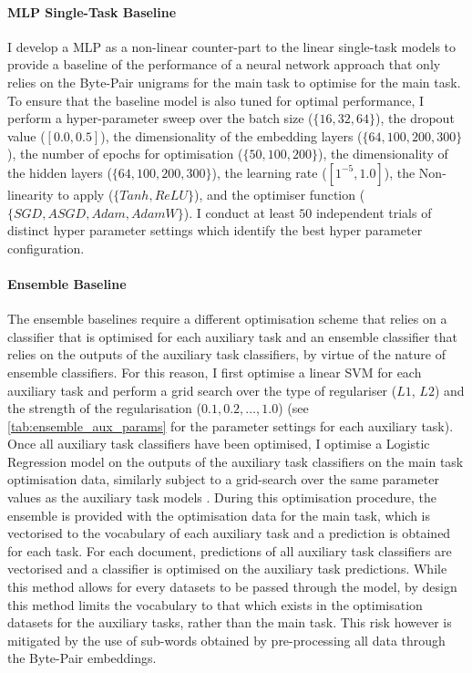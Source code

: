 \paragraph{MLP Single-Task Baseline}
I develop a MLP as a non-linear counter-part to the linear single-task models to provide a baseline of the performance of a neural network approach that only relies on the Byte-Pair unigrams for the main task to optimise for the main task.
To ensure that the baseline model is also tuned for optimal performance, I perform a hyper-parameter sweep  over the batch size ($\{16, 32, 64\}$), the dropout value ($[0.0, 0.5]$), the dimensionality of the embedding layers ($\{64, 100, 200, 300\}$), the number of epochs for optimisation ($\{50, 100, 200\}$), the dimensionality of the hidden layers ($\{64, 100, 200, 300\}$), the learning rate ($[1^{-5}, 1.0]$), the Non-linearity to apply ($\{Tanh, ReLU\}$), and the optimiser function ($\{SGD, ASGD, Adam, AdamW\}$).
I conduct at least $50$ independent trials of distinct hyper parameter settings which identify the best hyper parameter configuration.

\paragraph{Ensemble Baseline}
The ensemble baselines require a different optimisation scheme that relies on a classifier that is optimised for each auxiliary task and an ensemble classifier that relies on the outputs of the auxiliary task classifiers, by virtue of the nature of ensemble classifiers.
For this reason, I first optimise a linear SVM for each auxiliary task and perform a grid search over the type of regulariser ({$L1$, $L2$}) and the strength of the regularisation (${0.1, 0.2,\ldots, 1.0}$) (see \cref{tab:ensemble_aux_params} for the parameter settings for each auxiliary task).
Once all auxiliary task classifiers have been optimised, I optimise a Logistic Regression model on the outputs of the auxiliary task classifiers on the main task optimisation data, similarly subject to a grid-search over the same parameter values as the auxiliary task models
.
During this optimisation procedure, the ensemble is provided with the optimisation data for the main task, which is vectorised to the vocabulary of each auxiliary task and a prediction is obtained for each task.
For each document, predictions of all auxiliary task classifiers are vectorised and a classifier is optimised on the auxiliary task predictions.
While this method allows for every datasets to be passed through the model, by design this method limits the vocabulary to that which exists in the optimisation datasets for the auxiliary tasks, rather than the main task.
This risk however is mitigated by the use of sub-words obtained by pre-processing all data through the Byte-Pair embeddings.

